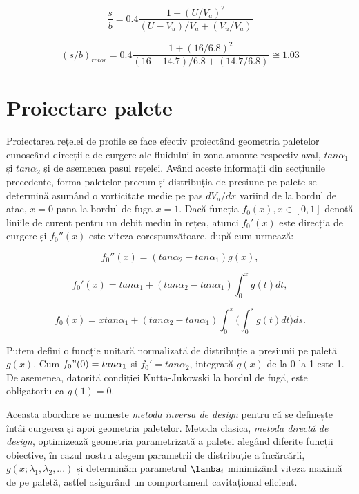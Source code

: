 \begin{equation}
\frac{s}{b} = 0.4 \frac{1 + (U / V_a)^2 } {(U - V_u) / V_a + (V_u / V_a)}
\end{equation}

\begin{equation}
(s/b)_{rotor} = 0.4 \frac{1 + (16 / 6.8)^2 } {(16 - 14.7) / 6.8 + (14.7 / 6.8)} \cong 1.03
\end{equation}

\clearpage


\section{Proiectare palete}

Proiectarea rețelei de profile se face efectiv proiectând geometria paletelor cunoscând direcțiile de curgere ale fluidului în zona amonte respectiv aval, $tan\alpha_1$ și $tan\alpha_2$ și de asemenea pasul rețelei. Având aceste informații din secțiunile precedente, forma paletelor precum și distribuția de presiune pe palete se determină asumând o vorticitate medie pe pas $dV_u/dx$ variind de la bordul de atac, $x=0$ pana la bordul de fuga $x=1$. Dacă funcția $f_0(x), x \in [0,1]$ denotă liniile de curent pentru un debit mediu în rețea, atunci $f_0'(x)$ este direcția de curgere și $f_0''(x)$ este viteza corespunzătoare, după cum urmează:

\begin{equation}
f_0''(x) = ( tan\alpha_2 - tan\alpha_1 ) g(x),
\end{equation}

\begin{equation}
f_0'(x) = tan\alpha_1 + ( tan\alpha_2 - tan\alpha_1 ) \int_{0}^x g(t)dt,
\end{equation}

\begin{equation}
f_0(x) = x tan\alpha_1 + ( tan\alpha_2 - tan\alpha_1 ) \int_{0}^x \Big( \int_{0}^s g(t)dt \Big) ds.
\end{equation}

Putem defini o funcție unitară normalizată de distribuție a presiunii pe paletă $g(x)$. Cum $f_0"(0) = tan \alpha_1$ si $f_0' = tan \alpha_2$, integrată $g(x)$ de la 0 la 1 este 1. De asemenea, datorită condiției Kutta-Jukowski la bordul de fugă, este obligatoriu ca $g(1) = 0$.

Aceasta abordare se numește \textit{metoda inversa de design} pentru că se definește întâi curgerea și apoi geometria paletelor. Metoda clasica, \textit{metoda directă de design}, optimizează geometria parametrizată a paletei alegând diferite funcții obiective, în cazul nostru alegem parametrii de distribuție a încărcării, $g(x; \lambda_1, \lambda_2,...)$ și determinăm parametrul $\lamba_i$ minimizând viteza maximă de pe paletă, astfel asigurând un comportament cavitațional eficient.

